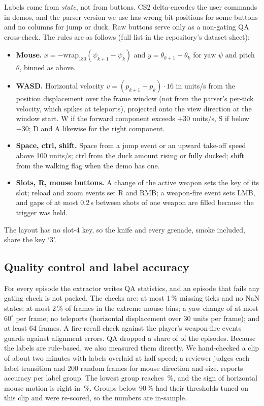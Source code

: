 Labels come from \emph{state}, not from buttons.
CS2 delta-encodes the user commands in demos, and the parser version we use has wrong bit positions for some buttons and no columns for jump or duck.
Raw buttons serve only as a non-gating QA cross-check.
The rules are as follows (full list in the repository's dataset sheet):
\begin{itemize}[nosep,leftmargin=1.2em]
  \item \textbf{Mouse.} $x=-\mathrm{wrap}_{180}(\psi_{k+1}-\psi_k)$ and $y=\theta_{k+1}-\theta_k$ for yaw $\psi$ and pitch $\theta$, binned as above.
  \item \textbf{WASD.} Horizontal velocity $v=(p_{k+1}-p_k)\cdot 16$ in units/s from the position displacement over the frame window (not from the parser's per-tick velocity, which spikes at teleports), projected onto the view direction at the window start. W if the forward component exceeds $+30$ units/s, S if below $-30$; D and A likewise for the right component.
  \item \textbf{Space, ctrl, shift.} Space from a jump event or an upward take-off speed above 100 units/s; ctrl from the duck amount rising or fully ducked; shift from the walking flag when the demo has one.
  \item \textbf{Slots, R, mouse buttons.} A change of the active weapon sets the key of its slot; reload and zoom events set R and RMB; a weapon-fire event sets LMB, and gaps of at most 0.2\,s between shots of one weapon are filled because the trigger was held.
\end{itemize}
The layout has no slot-4 key, so the knife and every grenade, smoke included, share the key `3'.

\subsection{Quality control and label accuracy}
For every episode the extractor writes QA statistics, and an episode that fails any gating check is not packed.
The checks are: at most 1\,\% missing ticks and no NaN states; at most 2\,\% of frames in the extreme mouse bins; a yaw change of at most $60^\circ$ per frame; no teleports (horizontal displacement over 30 units per frame); and at least 64 frames.
A fire-recall check against the player's weapon-fire events guards against alignment errors.
QA dropped a share of \TBDqadroprate of the episodes.
Because the labels are rule-based, we also measured them directly.
We hand-checked a clip of about two minutes with labels overlaid at half speed; a reviewer judges each label transition and 200 random frames for mouse direction and size.
 reports accuracy per label group.
The lowest group reaches \TBDlabelmin\,\%, and the sign of horizontal mouse motion is right in \TBDlabelxsign\,\%.
Groups below 90\,\% had their thresholds tuned on this clip and were re-scored, so the numbers are in-sample.

